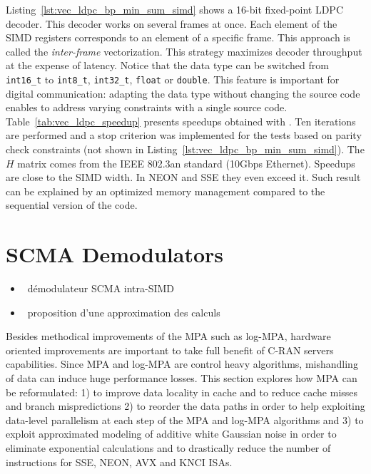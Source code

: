 Listing~\ref{lst:vec_ldpc_bp_min_sum_simd} shows a 16-bit fixed-point LDPC
decoder. This decoder works on several frames at once. Each element of the SIMD
registers corresponds to an element of a specific frame. This approach is called
the \textit{inter-frame} vectorization. This strategy maximizes decoder
throughput at the expense of latency. Notice that the data type can be switched
from \verb|int16_t| to \verb|int8_t|, \verb|int32_t|, \verb|float| or
\verb|double|. This \MIPP feature is important for digital communication:
adapting the data type without changing the source code enables to address
varying constraints with a single source code. Table~\ref{tab:vec_ldpc_speedup}
presents speedups obtained with \MIPP. Ten iterations are performed and a stop
criterion was implemented for the tests based on parity check constraints (not
shown in Listing~\ref{lst:vec_ldpc_bp_min_sum_simd}). The $H$ matrix comes from
the IEEE 802.3an standard (10Gbps Ethernet). Speedups are close to the SIMD
width. In NEON and SSE they even exceed it. Such result can be explained by an
optimized memory management compared to the sequential version of the code.

\section{SCMA Demodulators}
\label{sec:opt_scma}














\begin{itemize}
  \item \cmark~démodulateur SCMA intra-SIMD
  \item \cmark~proposition d'une approximation des calculs
\end{itemize}

Besides methodical improvements of the MPA such as log-MPA, hardware oriented
improvements are important to take full benefit of C-RAN servers capabilities.
Since MPA and log-MPA are control heavy algorithms, mishandling of data can
induce huge performance losses. This section explores how MPA can be
reformulated: 1) to improve data locality in cache and to reduce cache misses
and branch mispredictions 2) to reorder the data paths in order to help
exploiting data-level parallelism at each step of the MPA and log-MPA algorithms
and 3) to exploit approximated modeling of additive white Gaussian noise in
order to eliminate exponential calculations and to drastically reduce the number
of instructions for SSE, NEON, AVX and KNCI ISAs.

